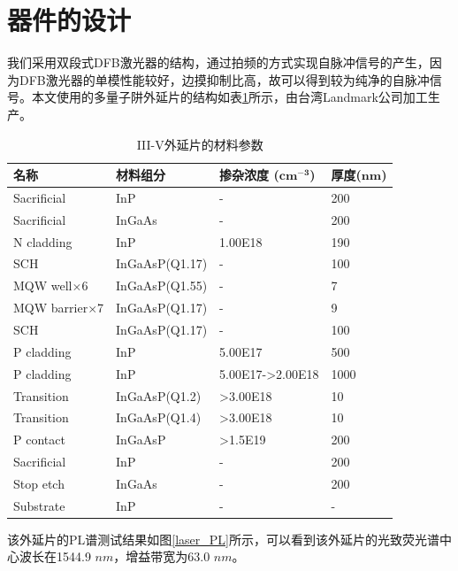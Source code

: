 \section{器件的设计}

我们采用双段式DFB激光器的结构，通过拍频的方式实现自脉冲信号的产生，因为DFB激光器的单模性能较好，边摸抑制比高，故可以得到较为纯净的自脉冲信号。本文使用的多量子阱外延片的结构如表\ref{laser_material}所示，由台湾Landmark公司加工生产。

\begin{table}[htb]
	\captionsetup{justification=centering}
	\caption{III-V外延片的材料参数}
	\label{laser_material}
	\centering
	\begin{tabular}[t]{|llll|}
		\hline
		\textbf{名称} & \textbf{材料组分} & \textbf{掺杂浓度 ($\pmb{cm^{-3}}$)} & \textbf{厚度($\pmb{nm}$)} \\
		\hline
		Sacrificial & InP & - &  200 \\
		\hline 
		Sacrificial & InGaAs & - &  200 \\
		\hline
		N cladding & InP & 1.00E18 & 190 \\
		\hline
		SCH & InGaAsP(Q1.17) & - & 100 \\
		\hline
		MQW well$\times$6 & InGaAsP(Q1.55) & - & 7 \\
		\hline
		MQW barrier$\times$7 & InGaAsP(Q1.17) & - & 9 \\
		\hline
		SCH & InGaAsP(Q1.17) & - & 100 \\
		\hline
		P cladding & InP & 5.00E17 & 500 \\
		\hline 
		P cladding & InP & 5.00E17->2.00E18 & 1000\\
		\hline
		Transition & InGaAsP(Q1.2) & >3.00E18 & 10\\
		\hline
		Transition & InGaAsP(Q1.4) & >3.00E18 & 10\\
		\hline
		P contact & InGaAsP & >1.5E19 & 200 \\
		\hline
		Sacrificial & InP & - & 200 \\
		\hline
		Stop etch & InGaAs & - & 200 \\
		\hline
		Substrate & InP & - & -\\
		\hline
	\end{tabular}
\end{table}

该外延片的PL谱测试结果如图\ref{laser_PL}所示，可以看到该外延片的光致荧光谱中心波长在1544.9 $nm$，增益带宽为63.0 $nm$。

